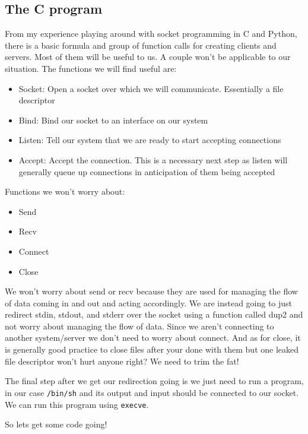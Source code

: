 \documentclass[11pt]{article}
\begin{document}
\subsection{The C program}
\label{sec-1-3}

From my experience playing around with socket programming in C and
Python, there is a basic formula and group of function calls for
creating clients and servers. Most of them will be useful to us. A
couple won't be applicable to our situation.  The functions we will
find useful are:

\begin{itemize}
\item Socket: Open a socket over which we will communicate. Essentially a file descriptor
\item Bind: Bind our socket to an interface on our system
\item Listen: Tell our system that we are ready to start accepting connections
\item Accept: Accept the connection. This is a necessary next step as listen will generally queue up connections in anticipation of them being accepted
\end{itemize}

Functions we won't worry about:

\begin{itemize}
\item Send
\item Recv
\item Connect
\item Close
\end{itemize}

We won't worry about send or recv because they are used for managing
the flow of data coming in and out and acting accordingly.  We are
instead going to just redirect stdin, stdout, and stderr over the
socket using a function called dup2 and not worry about managing the
flow of data. Since we aren't connecting to another system/server we
don't need to worry about connect. And as for close, it is generally
good practice to close files after your done with them but one leaked
file descriptor won't hurt anyone right? We need to trim the fat!

The final step after we get our redirection going is we just need to
run a program, in our case \verb~/bin/sh~ and its output and input should
be connected to our socket. We can run this program using \verb~execve~.

So lets get some code going!
\end{document}

